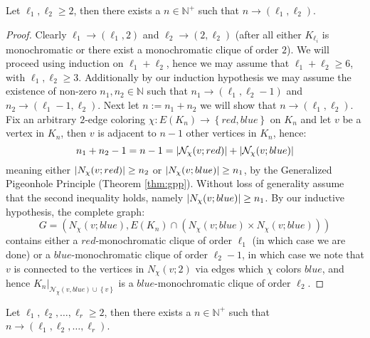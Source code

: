 \begin{theorem}\label{thm:ramsey_two_colors}
	Let $\ell_1, \ell_2 \geq 2$, then there exists a $n \in \mathbb{N}^{+}$ such that $n \to (\ell_1, \ell_2)$.
\end{theorem}
\begin{proof}
	Clearly $\ell_1 \to (\ell_1, 2)$ and $\ell_2 \to (2, \ell_2)$ (after all either $K_{\ell_{i}}$ is monochromatic or there exist a monochromatic clique of order $2$). We will proceed using induction on $\ell_1 + \ell_{2}$, hence we may assume that $\ell_1 + \ell_2 \geq 6$, with $\ell_1, \ell_2 \geq 3$.
	Additionally by our induction hypothesis we may assume the existence of non-zero $n_1, n_2 \in \mathbb{N}$ such that $n_1 \to (\ell_1, \ell_2 - 1)$ and $n_2 \to (\ell_1 - 1, \ell_2)$. Next let $n := n_1 + n_2$ we will show that $n \to (\ell_1, \ell_2)$. Fix an arbitrary $2$-edge coloring $\chi: E(K_{n}) \to \left\{red, blue\right\}$ on $K_n$ and let $v$ be a vertex in $K_n$, then $v$ is adjacent to $n - 1$ other vertices in $K_{n}$, hence:
	\begin{equation*}
		n_1 + n_2 - 1 = n - 1 = \left\lvert\mathcal{N}_{\chi}(v; red)\right\rvert + \left\lvert\mathcal{N}_{\chi}(v; blue)\right\rvert
	\end{equation*}
	meaning either $\left\lvert N_{\chi}(v; red)\right\rvert \geq n_2$ or $\left\lvert N_{\chi}(v; blue)\right\rvert \geq n_1$, by the Generalized Pigeonhole Principle (Theorem \ref{thm:gpp}). Without loss of generality assume that the second inequality holds, namely $\left\lvert N_{\chi}(v; blue)\right\rvert \geq n_1$. By our inductive hypothesis, the complete graph:
	\begin{equation*}
		G = \left(N_{\chi}(v; blue), E(K_{n}) \cap (N_{\chi}(v; blue) \times N_{\chi}(v; blue))\right)
	\end{equation*}
	contains either a $red$-monochromatic clique of order $\ell_{1}$ (in which case we are done) or a $blue$-monochromatic clique of order $\ell_{2} - 1$, in which case we note that $v$ is connected to the vertices in $N_{\chi}(v; 2)$ via edges which $\chi$ colors $blue$, and hence $K_n |_{\mathcal{N}_{\chi}(v, blue) \cup \left\{v\right\}}$ is a $blue$-monochromatic clique of order $\ell_{2}$.
\end{proof}

\begin{corollary}\label{cor:ramsey_for_arbitarily_many_colors}
	Let $\ell_1, \ell_2, \ldots, \ell_r \geq 2$, then there exists a $n \in \mathbb{N}^{+}$ such that $n \to (\ell_1, \ell_2, \ldots, \ell_{r})$.
\end{corollary}

